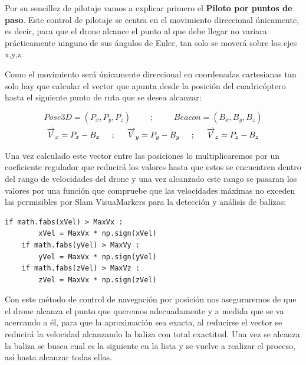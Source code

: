 \hspace{1cm} Por su sencillez de pilotaje vamos a explicar primero el \textbf{Piloto por puntos de paso}. Este control de pilotaje se centra en el movimiento direccional únicamente, es decir, para que el drone alcance el punto al que debe llegar no variara prácticamente ninguno de sus ángulos de Euler, tan solo se moverá sobre los ejes x,y,z.

\hspace{1cm} Como el movimiento será únicamente direccional en coordenadas cartesianas tan solo hay que calcular el vector que apunta desde la posición del cuadricóptero hasta el siguiente punto de ruta que se desea alcanzar: 

\[Pose3D = (P_{x}, P_{y}, P_{z})\hspace{1cm};\hspace{1cm}Beacon = (B_{x}, B_{y}, B_{z})\]
\[\overrightarrow{V}_{x} = P_{x} - B_{x}\hspace{0.5cm};\hspace{0.5cm}\overrightarrow{V}_{y} = P_{y} - B_{y}\hspace{0.5cm};\hspace{0.5cm}\overrightarrow{V}_{z} = P_{z} - B_{z}\]

\hspace{1cm} Una vez calculado este vector entre las posiciones lo multiplicaremos por un coeficiente regulador que reducirá los valores hasta que estos se encuentren dentro del rango de velocidades del drone y una vez alcanzado este rango se pasaran los valores por una función que compruebe que las velocidades máximas no exceden las permisibles por Slam VisuaMarkers para la detección y análisis de balizas: 

\begin{lstlisting}[backgroundcolor=\color{gray!15}]
    if math.fabs(xVel) > MaxVx :
        xVel = MaxVx * np.sign(xVel)
    if math.fabs(yVel) > MaxVy :
        yVel = MaxVx * np.sign(yVel)
    if math.fabs(zVel) > MaxVz :
        zVel = MaxVx * np.sign(zVel)        
\end{lstlisting}

\hspace{1cm} Con este método de control de navegación por posición nos aseguraremos de que el drone alcanza el punto que queremos adecuadamente y a medida que se va acercando a él, para que la aproximación sea exacta, al reducirse el vector se reducirá la velocidad alcanzando la baliza con total exactitud. Una vez se alcanza la baliza se busca cual es la siguiente en la lista y se vuelve a realizar el proceso, así hasta alcanzar todas ellas.

